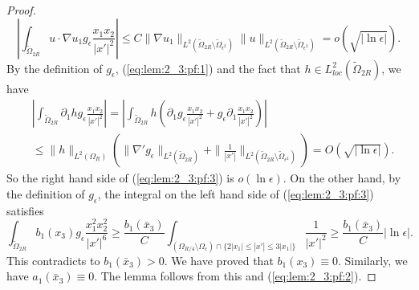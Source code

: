 \documentclass[12pt]{article}
\begin{document}
\begin{proof}
	\begin{equation*}
		|\int_{\tilde{\Omega}_{2R}}u\cdot \nabla u_1g_{\epsilon}\frac{x_1x_2}{|x'|^2}| \le C\|\nabla u_1\|_{L^2(\tilde{\Omega}_{2R}\setminus\tilde{\Omega}_{\epsilon^2})}\|u\|_{L^2(\tilde{\Omega}_{2R}\setminus\tilde{\Omega}_{\epsilon^2})}=o(\sqrt{| \ln \epsilon|}).
	\end{equation*}
	By the definition of $g_{\epsilon}$, (\ref{eq:lem:2_3:pf:1}) and the fact that $h\in L^2_{loc}(\tilde{\Omega}_{2R})$, 
	we have 
	\begin{equation*}
	\begin{split}
		& |\int_{\tilde{\Omega}_{2R}}\partial_1hg_{\epsilon}\frac{x_1x_2}{|x'|^2}| =|\int_{\tilde{\Omega}_{2R}}h(\partial_1g_{\epsilon}\frac{x_1x_2}{|x'|^2}+g_{\epsilon}\partial_1 \frac{x_1x_2}{|x'|^2})|\\
		& \le \|h\|_{L^2(\Omega_R)}(\|\nabla' g_{\epsilon}\|_{L^2(\tilde{\Omega}_{2R})}+\|\frac{1}{|x'|}\|_{L^2(\tilde{\Omega}_{2R}\setminus\tilde{\Omega}_{\epsilon^2})})=O(\sqrt{| \ln\epsilon|}). 
		\end{split}
	\end{equation*}
	So the right hand side of (\ref{eq:lem:2_3:pf:3}) is $o(\ln \epsilon)$. On the other hand, by the definition of $g_{\epsilon}$, the integral on the left hand side of (\ref{eq:lem:2_3:pf:3}) satisfies 
	\begin{equation*}
		\int_{ \tilde{\Omega}_{2R} } b_1(x_3)g_{\epsilon} \frac{ x_1^2 x_2^2 }{ |x'|^6 } \ge \frac{b_1(\bar{x}_3)}{C} \int_{ ( \Omega_{R/4} \setminus \Omega_{\epsilon} ) \cap \{ 2 |x_1| \le |x'| \le 3 |x_1| \} } \frac{1}{ |x'|^2 } 
		\ge \frac{b_1(\bar{x}_3)}{C} | \ln \epsilon |. 
	\end{equation*}
	This contradicts to $b_1(\bar{x}_3)>0$. We have proved that $b_1(x_3)\equiv 0$. Similarly, we have $a_1(\bar{x}_3)\equiv 0$. The lemma follows from this and (\ref{eq:lem:2_3:pf:2}). 
\end{proof}
\end{document}
